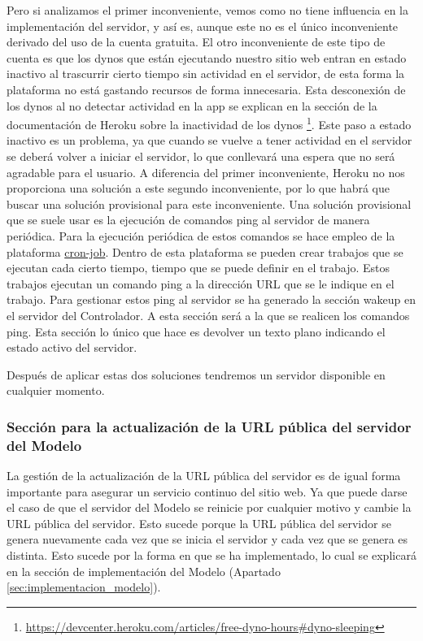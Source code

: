 Pero si analizamos el primer inconveniente, vemos como no tiene influencia en la implementación del servidor, y así es, aunque este no es el único inconveniente derivado del uso de la cuenta gratuita. El otro inconveniente de este tipo de cuenta es que los dynos que están ejecutando nuestro sitio web entran en estado inactivo al trascurrir cierto tiempo sin actividad en el servidor, de esta forma la plataforma no está gastando recursos de forma innecesaria. Esta desconexión de los dynos al no detectar actividad en la app se explican en la sección de la documentación de Heroku sobre la inactividad de los dynos \footnote{\url{https://devcenter.heroku.com/articles/free-dyno-hours#dyno-sleeping}}. Este paso a estado inactivo es un problema, ya que cuando se vuelve a tener actividad en el servidor se deberá volver a iniciar el servidor, lo que conllevará una espera que no será agradable para el usuario. A diferencia del primer inconveniente, Heroku no nos proporciona una solución a este segundo inconveniente, por lo que habrá que buscar una solución provisional para este inconveniente. Una solución provisional que se suele usar es la ejecución de comandos ping al servidor de manera periódica. Para la ejecución periódica de estos comandos se hace empleo de la plataforma \href{https://console.cron-job.org/}{cron-job}. Dentro de esta plataforma se pueden crear trabajos que se ejecutan cada cierto tiempo, tiempo que se puede definir en el trabajo. Estos trabajos ejecutan un comando ping a la dirección URL que se le indique en el trabajo. Para gestionar estos ping al servidor se ha generado la sección wakeup en el servidor del Controlador. A esta sección será a la que se realicen los comandos ping. Esta sección lo único que hace es devolver un texto plano indicando el estado activo del servidor.

Después de aplicar estas dos soluciones tendremos un servidor disponible en cualquier momento.

\subsubsection*{Sección para la actualización de la URL pública del servidor del Modelo}

La gestión de la actualización de la URL pública del servidor es de igual forma importante para asegurar un servicio continuo del sitio web. Ya que puede darse el caso de que el servidor del Modelo se reinicie por cualquier motivo y cambie la URL pública del servidor. Esto sucede porque la URL pública del servidor se genera nuevamente cada vez que se inicia el servidor y cada vez que se genera es distinta. Esto sucede por la forma en que se ha implementado, lo cual se explicará en la sección de implementación del Modelo (Apartado \ref{sec:implementacion_modelo}).

